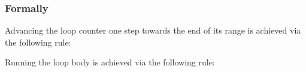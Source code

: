 \subsubsection{Formally}
Advancing the loop counter one step towards the end of its range is achieved via the following rule:
\begin{mathpar}
\end{mathpar}

Running the loop body is achieved via the following rule:
\begin{mathpar}
\end{mathpar}

